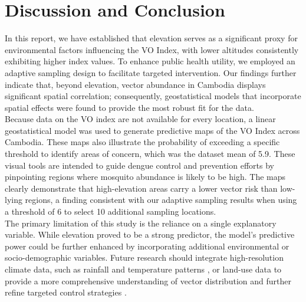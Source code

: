 \documentclass[12pt]{article}
\begin{document}
\section{Discussion and Conclusion}
In this report, we have established that elevation serves as a significant proxy for environmental factors influencing the VO Index, with lower altitudes consistently exhibiting higher index values. To enhance public health utility, we employed an adaptive sampling design to facilitate targeted intervention. Our findings further indicate that, beyond elevation, vector abundance in Cambodia displays significant spatial correlation; consequently, geostatistical models that incorporate spatial effects were found to provide the most robust fit for the data. \\

\noindent Because data on the VO index are not available for every location, a linear geostatistical model was used to generate predictive maps of the VO Index across Cambodia. These maps also illustrate the probability of exceeding a specific threshold to identify areas of concern, which was the dataset mean of 5.9. These visual tools are intended to guide dengue control and prevention efforts by pinpointing regions where mosquito abundance is likely to be high. The maps clearly demonstrate that high-elevation areas carry a lower vector risk than low-lying regions, a finding consistent with our adaptive sampling results when using a threshold of 6 to select 10 additional sampling locations. \\

\noindent The primary limitation of this study is the reliance on a single explanatory variable. While elevation proved to be a strong predictor, the model’s predictive power could be further enhanced by incorporating additional environmental or socio-demographic variables. Future research should integrate high-resolution climate data, such as rainfall and temperature patterns , or land-use data to provide a more comprehensive understanding of vector distribution and further refine targeted control strategies\cite{hii2012forecast} \cite{pinontoan2022variability} \cite{sarfraz2012analyzing}.

\clearpage



\printbibliography



\newpage
\end{document}
